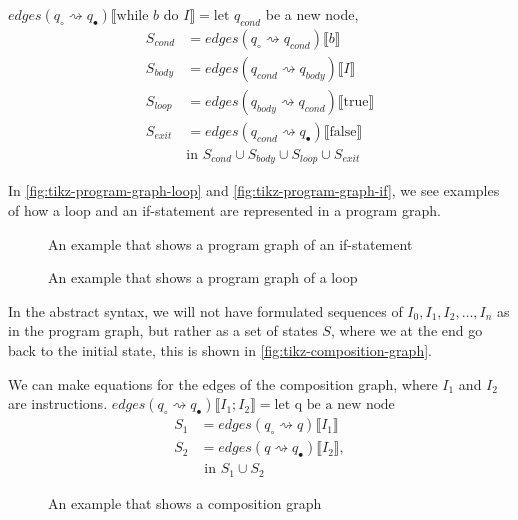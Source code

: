 $edges(q_{\circ} \rightsquigarrow q_{\bullet})\llbracket \text{while } b \text{ do } I\rrbracket= \text{let } q_{cond}$ be a new node,
\begin{align}
    S_{cond} &= edges(q_\circ \rightsquigarrow q_{cond}) \llbracket b \rrbracket \\
    S_{body}&=edges(q_{cond} \rightsquigarrow q_{body})\llbracket I \rrbracket \\
    S_{loop} &= edges(q_{body} \rightsquigarrow q_{cond})\llbracket\text{true}\rrbracket \\
    S_{exit} &= edges(q_{cond} \rightsquigarrow q_{\bullet})\llbracket\text{false}\rrbracket \\
    &\text{in } S_{cond} \cup S_{body} \cup S_{loop} \cup S_{exit}
\end{align}

In \autoref{fig:tikz-program-graph-loop} and \autoref{fig:tikz-program-graph-if}, we see examples of how a loop and an if-statement are represented in a program graph.

\begin{figure}[htb!]
    \center
    
    \caption{An example that shows a program graph of an if-statement}
    \label{fig:tikz-program-graph-if}
\end{figure}

\begin{figure}[htb!]
    \center
    
    \caption{An example that shows a program graph of a loop}
    \label{fig:tikz-program-graph-loop}
\end{figure}

In the abstract syntax, we will not have formulated sequences of $I_0, I_1, I_2, \dots, I_n$ as in the program graph, but rather as a set of states $S$, where we at the end go back to the initial state, this is shown in \autoref{fig:tikz-composition-graph}.

We can make equations for the edges of the composition graph, where $I_1$ and $I_2$ are instructions.
$edges(q_{\circ} \rightsquigarrow q_{\bullet})\llbracket I_1 ; I_2 \rrbracket = \text{let q be a new node}$
\begin{align}
S_1 &= edges(q_{\circ} \rightsquigarrow q)\llbracket I_1 \rrbracket\\
S_2 &= edges(q \rightsquigarrow q_{\bullet})\llbracket I_2 \rrbracket, \\
&\text{ in } S_1 \cup S_2
\end{align}

\begin{figure}
    \center
    
    \caption{An example that shows a composition graph}
    \label{fig:tikz-composition-graph}
\end{figure}
